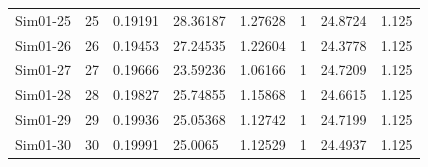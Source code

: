 \documentclass [10pt] {article}
\begin{document}
\begin{table}[H]
\begin{tabular}{c|cllllll}
		Sim01-25 & 25         & 0.19191                         & 28.36187      & 1.27628   & 1              & 24.8724       & 1.125     \\
		Sim01-26 & 26         & 0.19453                         & 27.24535      & 1.22604   & 1              & 24.3778       & 1.125     \\
		Sim01-27 & 27         & 0.19666                         & 23.59236      & 1.06166   & 1              & 24.7209       & 1.125     \\
		Sim01-28 & 28         & 0.19827                         & 25.74855      & 1.15868   & 1              & 24.6615       & 1.125     \\
		Sim01-29 & 29         & 0.19936                         & 25.05368      & 1.12742   & 1              & 24.7199       & 1.125     \\
		Sim01-30 & 30         & 0.19991                         & 25.0065       & 1.12529   & 1              & 24.4937       & 1.125    
	\end{tabular}
\end{table}
\end{document}
